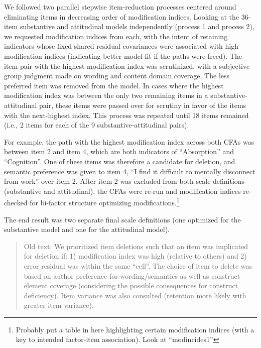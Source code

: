 \documentclass[
  english,
  man]{apa6}
\begin{document}
We followed two parallel stepwise item-reduction processes centered around eliminating items in decreasing order of modification indices. Looking at the 36-item substantive and attitudinal models independently (process 1 and process 2), we requested modification indices from each, with the intent of retaining indicators whose fixed shared residual covariances were associated with high modification indices (indicating better model fit if the paths were freed). The item pair with the highest modification index was scrutinized, with a subjective group judgment made on wording and content domain coverage. The less preferred item was removed from the model. In cases where the highest modification index was between the only two remaining items in a substantive-attitudinal pair, these items were passed over for scrutiny in favor of the items with the next-highest index. This process was repeated until 18 items remained (i.e., 2 items for each of the 9 substantive-attitudinal pairs).

For example, the path with the highest modification index across both CFAs was between item 2 and item 4, which are both indicators of \enquote{Absorption} and \enquote{Cognition}. One of these items was therefore a candidate for deletion, and semantic preference was given to item 4, \enquote{I find it difficult to mentally disconnect from work} over item 2. After item 2 was excluded from both scale definitions (substantive and attitudinal), the CFAs were re-run and modification indices re-checked for bi-factor structure optimizing modifications.\footnote{Probably put a table in here highlighting certain modification indices (with a key to intended factor-item association). Look at \enquote{modincides1}}

The end result was two separate final scale definitions (one optimized for the substantive model and one for the attitudinal model).

\begin{quote}
Old text: We prioritized item deletions such that an item was implicated for deletion if: 1) modification index was high (relative to others) and 2) error residual was within the same \enquote{cell}. The choice of item to delete was based on author preference for wording/semantics as well as construct element coverage (considering the possible consequences for construct deficiency). Item variance was also consulted (retention more likely with greater item variance).
\end{quote}
\end{document}
